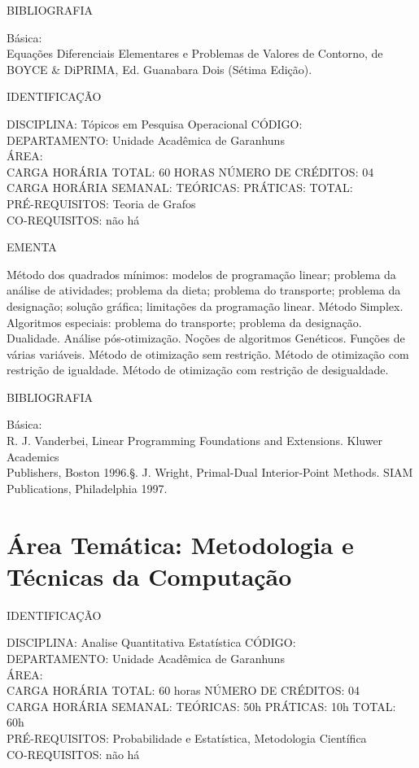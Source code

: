 \documentclass[
	12pt,				%
	openright,			%
  oneside,     %
	a4paper,			%
	chapter=TITLE,		%
	english,			%
	french,				%
	spanish,			%
	brazil				%
	]{abntex2}
\begin{document}
\begin{apendicesenv}
BIBLIOGRAFIA 

Básica:\\
Equações Diferenciais Elementares e Problemas de Valores de
Contorno, de BOYCE \& DiPRIMA, Ed. Guanabara Dois (Sétima Edição).

\newpage IDENTIFICAÇÃO

DISCIPLINA: Tópicos em Pesquisa Operacional CÓDIGO:\\ 
DEPARTAMENTO: Unidade Acadêmica de Garanhuns\\ 
ÁREA: \\
CARGA HORÁRIA TOTAL: 60 HORAS NÚMERO DE CRÉDITOS: 04\\
CARGA HORÁRIA SEMANAL: TEÓRICAS: PRÁTICAS: TOTAL: \\
PRÉ-REQUISITOS: Teoria de Grafos\\
CO-REQUISITOS: não há

EMENTA 

Método dos quadrados mínimos: modelos de programação linear; problema da análise de atividades; problema da dieta; problema do transporte; problema da designação; solução gráfica; limitações da programação linear. Método Simplex. Algoritmos especiais: problema do transporte; problema da designação. Dualidade. Análise pós-otimização. Noções de algoritmos Genéticos. Funções de várias variáveis. Método de otimização sem restrição. Método de otimização com restrição de igualdade. Método de otimização com restrição de desigualdade. 

BIBLIOGRAFIA 

Básica:\\
R. J. Vanderbei, Linear Programming  Foundations and Extensions.
Kluwer Academics\\
Publishers, Boston 1996.\S. J. Wright, Primal-Dual Interior-Point Methods. SIAM Publications,
Philadelphia 1997. 
\newpage

\section*{Área Temática: Metodologia e Técnicas da Computação}

IDENTIFICAÇÃO

DISCIPLINA: Analise Quantitativa Estatística CÓDIGO: \\
DEPARTAMENTO: Unidade Acadêmica de Garanhuns \\
ÁREA: \\
CARGA HORÁRIA TOTAL: 60 horas NÚMERO DE CRÉDITOS: 04\\
CARGA HORÁRIA SEMANAL: TEÓRICAS: 50h PRÁTICAS: 10h TOTAL: 60h\\
PRÉ-REQUISITOS: Probabilidade e Estatística, Metodologia Científica\\
CO-REQUISITOS: não há


\end{apendicesenv}
\end{document}
